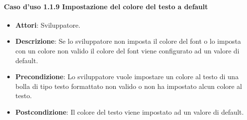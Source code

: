 \paragraph{Caso d'uso 1.1.9 Impostazione del colore del testo a default}
\begin{itemize}
\item\textbf{Attori}: Sviluppatore.
\item\textbf{Descrizione}: Se lo sviluppatore non imposta il colore del font o lo imposta con un colore non valido il colore del font viene configurato ad un valore di default.
\item\textbf{Precondizione}: Lo sviluppatore vuole impostare un colore al testo di una bolla di tipo testo formattato non valido o non ha impostato alcun colore al testo.
\item\textbf{Postcondizione}: Il colore del testo viene impostato ad un valore di default.
\end{itemize}